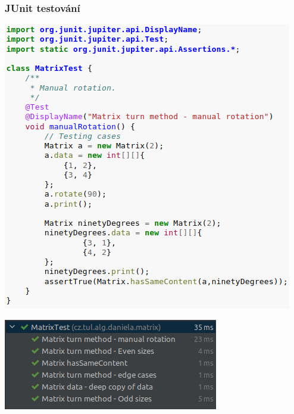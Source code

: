 \documentclass{beamer}
\begin{document}
\begin{frame}
    \frametitle{JUnit testování}
    \begin{multicols}{3}
        \includegraphics[scale=0.4]{alg1-unit-code}
        \columnbreak

        \columnbreak
        \includegraphics[scale=0.3]{alg1-unit-tests}
    \end{multicols}
\end{frame}
\end{document}
